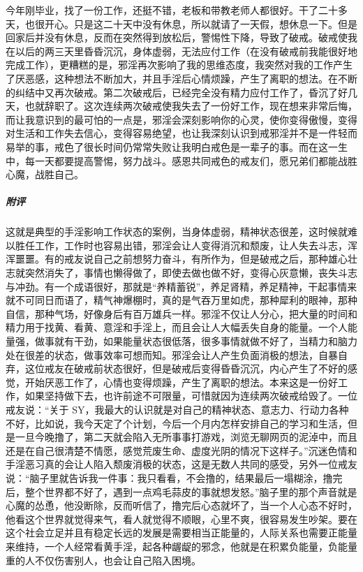 \begin{case}
    今年刚毕业，找了一份工作，还挺不错，老板和带教老师人都很好。干了二十多天，也很开心。只是这二十天中没有休息，所以就请了一天假，想休息一下。但是回家后并没有休息，反而在突然得到放松后，警惕性下降，导致了破戒。破戒使我在以后的两三天里昏昏沉沉，身体虚弱，无法应付工作（在没有破戒前我能很好地完成工作），更糟糕的是，邪淫再次影响了我的思维态度，我突然对我的工作产生了厌恶感，这种想法不断加大，并且手淫后心情烦躁，产生了离职的想法。在不断的纠结中又再次破戒。第二次破戒后，已经完全没有精力应付工作了，昏沉了好几天，也就辞职了。这次连续两次破戒使我失去了一份好工作，现在想来非常后悔，而让我意识到的最可怕的一点是，邪淫会深刻影响你的心灵，使你变得傲慢，变得对生活和工作失去信心，变得容易绝望，也让我深刻认识到戒邪淫并不是一件轻而易举的事，戒色了很长时间仍常常失败让我明白戒色是一辈子的事。而在这一生中，每一天都要提高警惕，努力战斗。感恩共同戒色的戒友们，愿兄弟们都能战胜心魔，战胜自己。
    \subparagraph{附评} 这就是典型的手淫影响工作状态的案例，当身体虚弱，精神状态很差，这时候就难以胜任工作，工作时也容易出错，邪淫会让人变得消沉和颓废，让人失去斗志，浑浑噩噩。有的戒友说自己之前想努力奋斗，有所作为，但是破戒之后，那种雄心壮志就突然消失了，事情也懒得做了，即使去做也做不好，变得心灰意懒，丧失斗志与冲劲。有一个成语很好，那就是“养精蓄锐”，养足肾精，养足精神，干起事情来就不可同日而语了，精气神爆棚时，真的是气吞万里如虎，那种犀利的眼神，那种自信，那种气场，好像身后有百万雄兵一样。邪淫不仅让人分心，把大量的时间和精力用于找黄、看黄、意淫和手淫上，而且会让人大幅丢失自身的能量。一个人能量强，做事就有干劲，如果能量状态很低落，很多事情就做不好了，当精力和脑力处在很差的状态，做事效率可想而知。邪淫会让人产生负面消极的想法，自暴自弃，这位戒友在破戒前状态很好，但是破戒后变得昏昏沉沉，内心产生了不好的感觉，开始厌恶工作了，心情也变得烦躁，产生了离职的想法。本来这是一份好工作，如果坚持做下去，也许前途不可限量，可惜就因为连续两次破戒给毁了。一位戒友说：“关于 SY，我最大的认识就是对自己的精神状态、意志力、行动力各种不好，比如说，我今天定了个计划，今后一个月内怎样安排自己的学习和生活，但是一旦今晚撸了，第二天就会陷入无所事事打游戏，浏览无聊网页的泥淖中，而且还是在自己很清楚不情愿，感觉荒废生命、虚度光阴的情况下这样子。”沉迷色情和手淫恶习真的会让人陷入颓废消极的状态，这是无数人共同的感受，另外一位戒友说：“脑子里就告诉我一件事：我只看看，不会撸的，结果最后一塌糊涂，撸完后，整个世界都不好了，遇到一点鸡毛蒜皮的事就想发怒。”脑子里的那个声音就是心魔的怂恿，他没断除，反而听信了，撸完后心态就坏了，当一个人心态不好时，他看这个世界就觉得来气，看人就觉得不顺眼，心里不爽，很容易发生吵架。要在这个社会立足并且有稳定长远的发展是需要相当正能量的，人际关系也需要正能量来维持，一个人经常看黄手淫，起各种龌龊的邪念，他就是在积累负能量，负能量重的人不仅伤害别人，也会让自己陷入困境。
\end{case}

